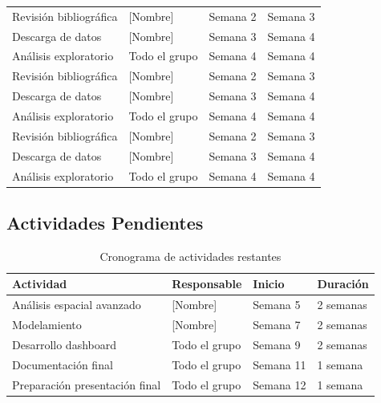 \begin{table}[H]
\begin{tabular}{@{}llll@{}}
Revisión bibliográfica & [Nombre] & Semana 2 & Semana 3 \\
Descarga de datos & [Nombre] & Semana 3 & Semana 4 \\
Análisis exploratorio & Todo el grupo & Semana 4 & Semana 4 \\
Revisión bibliográfica & [Nombre] & Semana 2 & Semana 3 \\
Descarga de datos & [Nombre] & Semana 3 & Semana 4 \\
Análisis exploratorio & Todo el grupo & Semana 4 & Semana 4 \\
Revisión bibliográfica & [Nombre] & Semana 2 & Semana 3 \\
Descarga de datos & [Nombre] & Semana 3 & Semana 4 \\
Análisis exploratorio & Todo el grupo & Semana 4 & Semana 4 \\
\bottomrule
\end{tabular}
\end{table}

\subsection{Actividades Pendientes}

\begin{table}[H]
\centering
\caption{Cronograma de actividades restantes}
\begin{tabular}{@{}llll@{}}
\toprule
\textbf{Actividad} & \textbf{Responsable} & \textbf{Inicio} & \textbf{Duración} \\
\midrule
Análisis espacial avanzado & [Nombre] & Semana 5 & 2 semanas \\
Modelamiento & [Nombre] & Semana 7 & 2 semanas \\
Desarrollo dashboard & Todo el grupo & Semana 9 & 2 semanas \\
Documentación final & Todo el grupo & Semana 11 & 1 semana \\
Preparación presentación final & Todo el grupo & Semana 12 & 1 semana \\
\bottomrule
\end{tabular}
\end{table}



